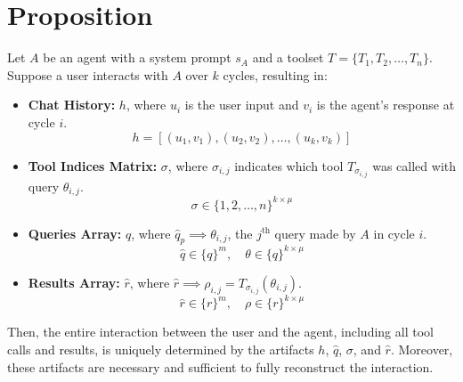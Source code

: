 \documentclass{article}
\begin{document}
\section*{Proposition}

Let $A$ be an agent with a system prompt $s_A$ and a toolset $T = \{ T_1, T_2, \dots, T_n \}$. Suppose a user interacts with $A$ over $k$ cycles, resulting in:

\begin{itemize}
    \item \textbf{Chat History:} $h$, where $u_i$ is the user input and $v_i$ is the agent’s response at cycle $i$.
    \[
    h = [(u_1,v_1), (u_2,v_2), \dots, (u_k,v_k)]
    \]
    \item \textbf{Tool Indices Matrix:} $\sigma$, where $\sigma_{i,j}$ indicates which tool $T_{\sigma_{i,j}}$ was called with query $\theta_{i,j}$.
    \[
    \sigma \in \{1, 2, \dots, n\}^{k \times \mu}
    \]
    \item \textbf{Queries Array:} $\hat{q}$, where $\hat{q}_p \implies \theta_{i,j}$, the $j^{\text{th}}$ query made by $A$ in cycle $i$.
    \[
    \hat{q} \in \{q\}^m, \quad \theta \in \{q\}^{k \times \mu}
    \]
    \item \textbf{Results Array:} $\hat{r}$, where $\hat{r} \implies \rho_{i,j} = T_{\sigma_{i,j}}(\theta_{i,j})$.
    \[
    \hat{r} \in \{r\}^m, \quad \rho \in \{r\}^{k \times \mu}
    \]
\end{itemize}

Then, the entire interaction between the user and the agent, including all tool calls and results, is uniquely determined by the artifacts $h$, $\hat{q}$, $\sigma$, and $\hat{r}$. Moreover, these artifacts are necessary and sufficient to fully reconstruct the interaction.
\end{document}
